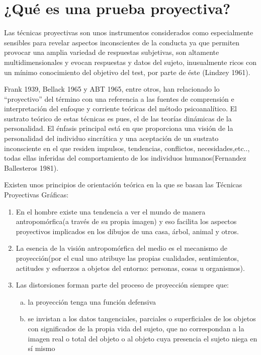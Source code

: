 \section{¿Qué es una prueba proyectiva?}

Las técnicas proyectivas son unos instrumentos considerados como especialmente sensibles para revelar aspectos inconscientes de la conducta ya que permiten provocar una amplia variedad de respuestas subjetivas, son altamente multidimensionales y evocan respuestas y datos del sujeto, inusualmente ricos con un mínimo conocimiento del objetivo del test, por parte de éste (Lindzey 1961).

Frank 1939, Bellack 1965 y ABT 1965, entre otros, han relacionado lo “proyectivo” del término con una referencia a las fuentes de comprensión e interpretación del enfoque y corriente teóricas del método psicoanalítico.
El sustrato teórico de estas técnicas es pues, el de las teorías dinámicas de la personalidad. El énfasis principal está en que proporciona una visión de la personalidad del individuo sincrática y una aceptación de un sustrato inconsciente en el que residen impulsos, tendencias, conflictos, necesidades,etc.., todas ellas inferidas del comportamiento de los individuos humanos(Fernandez Ballesteros 1981).

Existen unos principios de orientación teórica en la que se basan las Técnicas Proyectivas Gráficas:
\\
\begin{enumerate}[1)]
\item En el hombre existe una tendencia a ver el mundo de manera antropomórfica(a través de su propia imagen) y eso facilita los aspectos proyectivos implicados en los dibujos de una casa, árbol, animal y otros.
\item La esencia de la visión antropomórfica del medio es el mecanismo de proyección(por el cual uno atribuye las propias cualidades, sentimientos, actitudes y esfuerzos a objetos del entorno: personas, cosas u organismos).
\item Las distorsiones forman parte del proceso de proyección siempre que:
\begin{enumerate}[a)]
\item la proyección tenga una función defensiva
\item se invistan a los datos tangenciales, parciales o superficiales de los objetos con significados de la propia vida del sujeto, que no correspondan a la imagen real o total del objeto o al objeto cuya presencia el sujeto niega en sí mismo \cite{pruebaproyectiva}
\end{enumerate}
\end{enumerate}